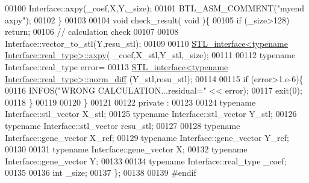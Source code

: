 \begin{DoxyCode}
00100     Interface::axpy(\_coef,X,Y,\_size);
00101     BTL\_ASM\_COMMENT(\textcolor{stringliteral}{"myend axpy"});
00102   \}
00103 
00104   \textcolor{keywordtype}{void} check\_result( \textcolor{keywordtype}{void} )\{
00105     \textcolor{keywordflow}{if} (\_size>128) \textcolor{keywordflow}{return};
00106     \textcolor{comment}{// calculation check}
00107 
00108     Interface::vector\_to\_stl(Y,resu\_stl);
00109 
00110     \hyperlink{class_s_t_l__interface}{STL\_interface<typename Interface::real\_type>::axpy}(
      \_coef,X\_stl,Y\_stl,\_size);
00111 
00112     \textcolor{keyword}{typename} Interface::real\_type error=
00113       \hyperlink{class_s_t_l__interface}{STL\_interface<typename Interface::real\_type>::norm\_diff}
      (Y\_stl,resu\_stl);
00114 
00115     \textcolor{keywordflow}{if} (error>1.e-6)\{
00116       INFOS(\textcolor{stringliteral}{"WRONG CALCULATION...residual="} << error);
00117       exit(0);
00118     \}
00119 
00120   \}
00121 
00122 private :
00123 
00124   \textcolor{keyword}{typename} Interface::stl\_vector X\_stl;
00125   \textcolor{keyword}{typename} Interface::stl\_vector Y\_stl;
00126   \textcolor{keyword}{typename} Interface::stl\_vector resu\_stl;
00127 
00128   \textcolor{keyword}{typename} Interface::gene\_vector X\_ref;
00129   \textcolor{keyword}{typename} Interface::gene\_vector Y\_ref;
00130 
00131   \textcolor{keyword}{typename} Interface::gene\_vector X;
00132   \textcolor{keyword}{typename} Interface::gene\_vector Y;
00133 
00134   \textcolor{keyword}{typename} Interface::real\_type \_coef;
00135 
00136   \textcolor{keywordtype}{int} \_size;
00137 \};
00138 
00139 \textcolor{preprocessor}{#endif}
\end{DoxyCode}
